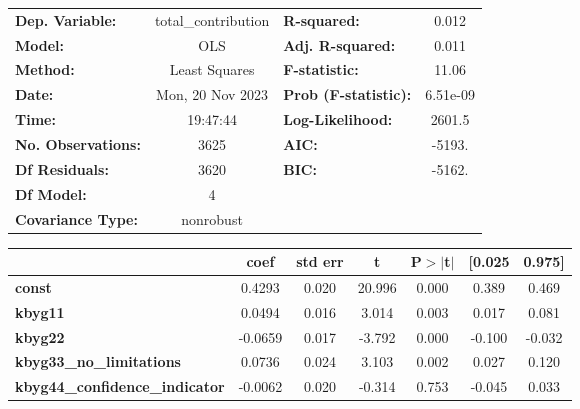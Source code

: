 \begin{center}
\begin{tabular}{lclc}
\toprule
\textbf{Dep. Variable:}                & total\_contribution & \textbf{  R-squared:         } &     0.012   \\
\textbf{Model:}                        &         OLS         & \textbf{  Adj. R-squared:    } &     0.011   \\
\textbf{Method:}                       &    Least Squares    & \textbf{  F-statistic:       } &     11.06   \\
\textbf{Date:}                         &   Mon, 20 Nov 2023  & \textbf{  Prob (F-statistic):} &  6.51e-09   \\
\textbf{Time:}                         &       19:47:44      & \textbf{  Log-Likelihood:    } &    2601.5   \\
\textbf{No. Observations:}             &          3625       & \textbf{  AIC:               } &    -5193.   \\
\textbf{Df Residuals:}                 &          3620       & \textbf{  BIC:               } &    -5162.   \\
\textbf{Df Model:}                     &             4       & \textbf{                     } &             \\
\textbf{Covariance Type:}              &      nonrobust      & \textbf{                     } &             \\
\bottomrule
\end{tabular}
\begin{tabular}{lcccccc}
                                       & \textbf{coef} & \textbf{std err} & \textbf{t} & \textbf{P$> |$t$|$} & \textbf{[0.025} & \textbf{0.975]}  \\
\midrule
\textbf{const}                         &       0.4293  &        0.020     &    20.996  &         0.000        &        0.389    &        0.469     \\
\textbf{kbyg11}                        &       0.0494  &        0.016     &     3.014  &         0.003        &        0.017    &        0.081     \\
\textbf{kbyg22}                        &      -0.0659  &        0.017     &    -3.792  &         0.000        &       -0.100    &       -0.032     \\
\textbf{kbyg33\_no\_limitations}       &       0.0736  &        0.024     &     3.103  &         0.002        &        0.027    &        0.120     \\
\textbf{kbyg44\_confidence\_indicator} &      -0.0062  &        0.020     &    -0.314  &         0.753        &       -0.045    &        0.033     \\

\end{tabular}
\end{center}
